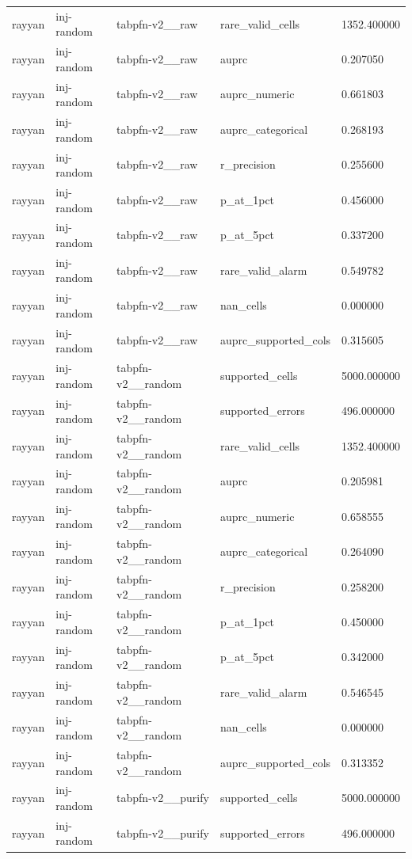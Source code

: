 \begin{tabular}{lllll}
rayyan & inj-random & tabpfn-v2\_\_raw & rare\_valid\_cells & 1352.400000 \\
rayyan & inj-random & tabpfn-v2\_\_raw & auprc & 0.207050 \\
rayyan & inj-random & tabpfn-v2\_\_raw & auprc\_numeric & 0.661803 \\
rayyan & inj-random & tabpfn-v2\_\_raw & auprc\_categorical & 0.268193 \\
rayyan & inj-random & tabpfn-v2\_\_raw & r\_precision & 0.255600 \\
rayyan & inj-random & tabpfn-v2\_\_raw & p\_at\_1pct & 0.456000 \\
rayyan & inj-random & tabpfn-v2\_\_raw & p\_at\_5pct & 0.337200 \\
rayyan & inj-random & tabpfn-v2\_\_raw & rare\_valid\_alarm & 0.549782 \\
rayyan & inj-random & tabpfn-v2\_\_raw & nan\_cells & 0.000000 \\
rayyan & inj-random & tabpfn-v2\_\_raw & auprc\_supported\_cols & 0.315605 \\
rayyan & inj-random & tabpfn-v2\_\_random & supported\_cells & 5000.000000 \\
rayyan & inj-random & tabpfn-v2\_\_random & supported\_errors & 496.000000 \\
rayyan & inj-random & tabpfn-v2\_\_random & rare\_valid\_cells & 1352.400000 \\
rayyan & inj-random & tabpfn-v2\_\_random & auprc & 0.205981 \\
rayyan & inj-random & tabpfn-v2\_\_random & auprc\_numeric & 0.658555 \\
rayyan & inj-random & tabpfn-v2\_\_random & auprc\_categorical & 0.264090 \\
rayyan & inj-random & tabpfn-v2\_\_random & r\_precision & 0.258200 \\
rayyan & inj-random & tabpfn-v2\_\_random & p\_at\_1pct & 0.450000 \\
rayyan & inj-random & tabpfn-v2\_\_random & p\_at\_5pct & 0.342000 \\
rayyan & inj-random & tabpfn-v2\_\_random & rare\_valid\_alarm & 0.546545 \\
rayyan & inj-random & tabpfn-v2\_\_random & nan\_cells & 0.000000 \\
rayyan & inj-random & tabpfn-v2\_\_random & auprc\_supported\_cols & 0.313352 \\
rayyan & inj-random & tabpfn-v2\_\_purify & supported\_cells & 5000.000000 \\
rayyan & inj-random & tabpfn-v2\_\_purify & supported\_errors & 496.000000 \\

\end{tabular}
